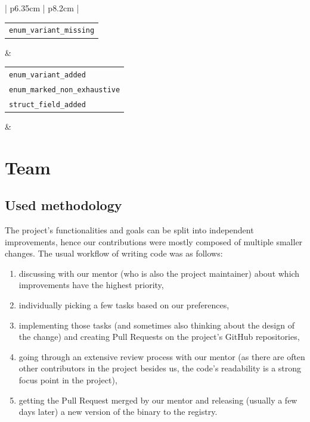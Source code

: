 \documentclass[licencjacka,en]{pracamgr}
\begin{document}
\begin{center}
\begin{longtable}{| p{6.35cm} | p{8.2cm} |}
\begin{tabular}[c]{@{}l@{}}
				\texttt{enum\_variant\_missing}
			\end{tabular} &
			 \\
		\hline
			\begin{tabular}[c]{@{}l@{}}
				\texttt{enum\_variant\_added} \\
				\texttt{enum\_marked\_non\_exhaustive} \\
				\texttt{struct\_field\_added}
			\end{tabular} &
			 \\
		\hline
	\end{longtable}
\end{center}

\chapter{Team}\label{r:chapter_team}

\section{Used methodology}\label{r:section_used_methodology}

The project's functionalities and goals can be split into independent improvements, hence our
contributions were mostly composed of multiple smaller changes. The usual workflow of writing
code was as follows:
\begin{enumerate}
	\item discussing with our mentor (who is also the project maintainer) about which improvements
		have the highest priority,
	\item individually picking a few tasks based on our preferences,
	\item implementing those tasks (and sometimes also thinking about the design of the change)
		and creating Pull Requests on the project's GitHub repositories,
	\item going through an extensive review process with our mentor (as there are often other
		contributors in the project besides us, the code's readability is a strong focus point
		in the project),
	\item getting the Pull Request merged by our mentor and releasing (usually a few days later)
		a new version of the binary to the registry.
\end{enumerate}
\end{document}
